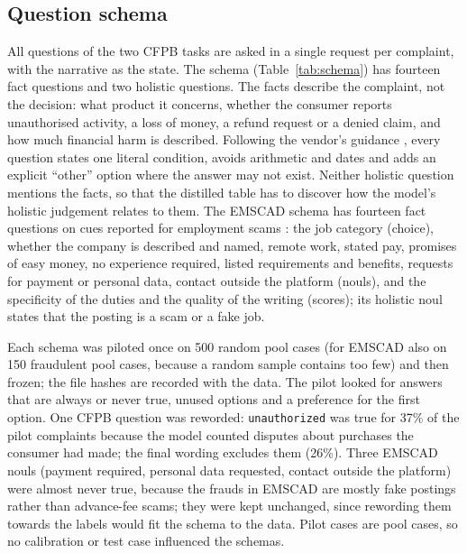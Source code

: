 \documentclass[a4paper,fleqn]{cas-sc}
\theoremstyle{definition}
\newcommand{\feel}[1]{\texttt{#1}}
\begin{document}
\subsection{Question schema}\label{sec:schema}
All questions of the two CFPB tasks are asked in a single request per complaint, with the narrative as the state. The schema (Table~\ref{tab:schema}) has fourteen fact questions and two holistic questions. The facts describe the complaint, not the decision: what product it concerns, whether the consumer reports unauthorised activity, a loss of money, a refund request or a denied claim, and how much financial harm is described. Following the vendor's guidance \citep{typesafe2026jagged}, every question states one literal condition, avoids arithmetic and dates and adds an explicit ``other'' option where the answer may not exist. Neither holistic question mentions the facts, so that the distilled table has to discover how the model's holistic judgement relates to them. The EMSCAD schema has fourteen fact questions on cues reported for employment scams \citep{vidros2017}: the job category (choice), whether the company is described and named, remote work, stated pay, promises of easy money, no experience required, listed requirements and benefits, requests for payment or personal data, contact outside the platform (nouls), and the specificity of the duties and the quality of the writing (scores); its holistic noul states that the posting is a scam or a fake job.

Each schema was piloted once on 500 random pool cases (for EMSCAD also on 150 fraudulent pool cases, because a random sample contains too few) and then frozen; the file hashes are recorded with the data. The pilot looked for answers that are always or never true, unused options and a preference for the first option. One CFPB question was reworded: \feel{unauthorized} was true for 37\% of the pilot complaints because the model counted disputes about purchases the consumer had made; the final wording excludes them (26\%). Three EMSCAD nouls (payment required, personal data requested, contact outside the platform) were almost never true, because the frauds in EMSCAD are mostly fake postings rather than advance-fee scams; they were kept unchanged, since rewording them towards the labels would fit the schema to the data. Pilot cases are pool cases, so no calibration or test case influenced the schemas.
\end{document}
